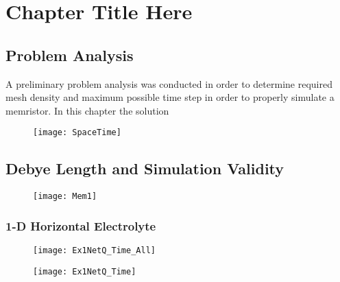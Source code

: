 
\chapter{Chapter Title Here} %

\label{Chapter5} %


\section{Problem Analysis}

A preliminary problem analysis was conducted in order to determine required mesh density and maximum possible time step in order to properly simulate a memristor. In this chapter the solution 

\begin{figure}[htp]
\centering
\texttt{[image: SpaceTime]}
\caption{} 
\label{}
\end{figure}


\clearpage
\section{Debye Length and Simulation Validity}
\begin{figure}[!htp]
\centering
\texttt{[image: Mem1]}
\caption{} 
\label{}
\end{figure}


\subsection{1-D Horizontal Electrolyte}

\begin{figure}[!htp]
\centering
\texttt{[image: Ex1NetQ\_Time\_All]}
\caption{} 
\label{}
\end{figure}



\begin{landscape}
\begin{figure}[!htp]
\centering
\texttt{[image: Ex1NetQ\_Time]}
\caption{} 
\label{}
\end{figure}
\end{landscape}

